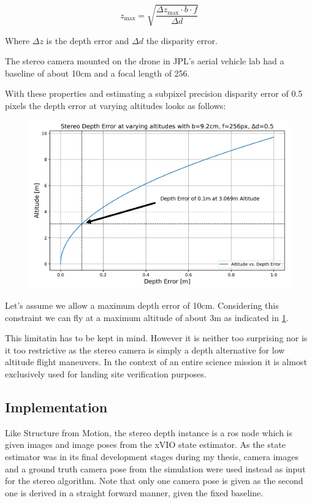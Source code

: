 \begin{equation}
    z_{\text{max}} = \sqrt{\frac{\Delta z_{\text{max}} \cdot b \cdot f}{\Delta d}}
\end{equation}

Where $\Delta z$ is the depth error and $\Delta d$ the disparity error.

The stereo camera mounted on the drone in JPL's aerial vehicle lab had a baseline of about 10cm and a focal length of 256.

With these properties and estimating a subpixel precision disparity error of 0.5 pixels the depth error at varying altitudes looks as follows:

\begin{figure}
    \centering
    \includegraphics[scale=0.19]{images/preparation/stereo_limit.png}
    \label{fig:stereo_limit}
\end{figure}

Let's assume we allow a maximum depth error of 10cm. Considering this constraint we can fly at a maximum altitude of about 3m as indicated in \cref{fig:stereo_limit}.

This limitatin has to be kept in mind. However it is neither too surprising nor is it too restrictive as the stereo camera is simply a depth alternative for low altitude flight maneuvers. In the context of an entire science mission it is almost exclusively used for landing site verification purposes.

\subsection{Implementation}

Like Structure from Motion, the stereo depth instance is a ros node which is given images and image poses from the xVIO state estimator. As the state estimator was in its final development stages during my thesis, camera images and a ground truth camera pose from the simulation were used instead as input for the stereo algorithm. Note that only one camera pose is given as the second one is derived in a straight forward manner, given the fixed baseline.

